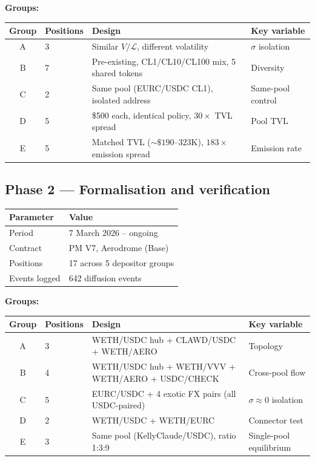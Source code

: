 \documentclass[11pt,a4paper]{article}
\begin{document}
\textbf{Groups:}

\begin{table}[H]
\centering\small
\begin{tabular}{@{}clp{6cm}l@{}}
\toprule
Group & Positions & Design & Key variable \\
\midrule
A & 3 & Similar $V/\mathcal{L}$, different volatility & $\sigma$ isolation \\
B & 7 & Pre-existing, CL1/CL10/CL100 mix, 5 shared tokens & Diversity \\
C & 2 & Same pool (EURC/USDC CL1), isolated address & Same-pool control \\
D & 5 & \$500 each, identical policy, $30\times$ TVL spread & Pool TVL \\
E & 5 & Matched TVL (${\sim}\$190$--$323$K), $183\times$ emission spread & Emission rate \\
\bottomrule
\end{tabular}
\end{table}

\subsection{Phase 2 --- Formalisation and verification}\label{sec:phase2}

\begin{table}[H]
\centering
\begin{tabular}{@{}ll@{}}
\toprule
Parameter & Value \\
\midrule
Period          & 7 March 2026 -- ongoing \\
Contract        & PM V7, Aerodrome (Base) \\
Positions       & 17 across 5 depositor groups \\
Events logged   & 642 diffusion events \\
\bottomrule
\end{tabular}
\end{table}

\textbf{Groups:}

\begin{table}[H]
\centering\small
\begin{tabular}{@{}clp{6cm}l@{}}
\toprule
Group & Positions & Design & Key variable \\
\midrule
A & 3 & WETH/USDC hub + CLAWD/USDC + WETH/AERO & Topology \\
B & 4 & WETH/USDC hub + WETH/VVV + WETH/AERO + USDC/CHECK & Cross-pool flow \\
C & 5 & EURC/USDC + 4 exotic FX pairs (all USDC-paired) & $\sigma \approx 0$ isolation \\
D & 2 & WETH/USDC + WETH/EURC & Connector test \\
E & 3 & Same pool (KellyClaude/USDC), ratio 1:3:9 & Single-pool equilibrium \\
\bottomrule
\end{tabular}
\end{table}
\end{document}
